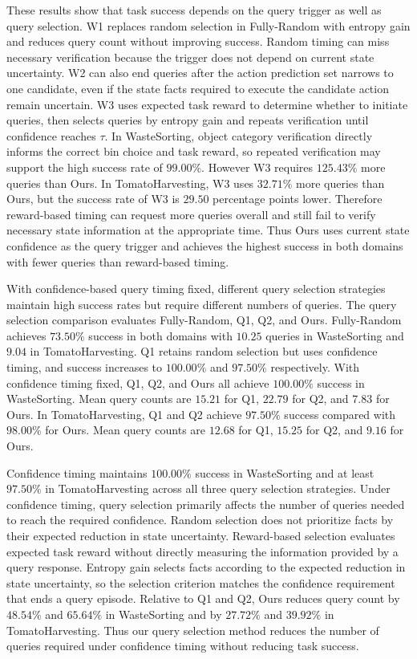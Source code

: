 These results show that task success depends on the query trigger as well as query selection. W1 replaces random selection in Fully-Random with entropy gain and reduces query count without improving success. Random timing can miss necessary verification because the trigger does not depend on current state uncertainty. W2 can also end queries after the action prediction set narrows to one candidate, even if the state facts required to execute the candidate action remain uncertain. W3 uses expected task reward to determine whether to initiate queries, then selects queries by entropy gain and repeats verification until confidence reaches $\tau$. In WasteSorting, object category verification directly informs the correct bin choice and task reward, so repeated verification may support the high success rate of $99.00\%$. However W3 requires $125.43\%$ more queries than Ours. In TomatoHarvesting, W3 uses $32.71\%$ more queries than Ours, but the success rate of W3 is $29.50$ percentage points lower. Therefore reward-based timing can request more queries overall and still fail to verify necessary state information at the appropriate time. Thus Ours uses current state confidence as the query trigger and achieves the highest success in both domains with fewer queries than reward-based timing.

With confidence-based query timing fixed, different query selection strategies maintain high success rates but require different numbers of queries. The query selection comparison evaluates Fully-Random, Q1, Q2, and Ours. Fully-Random achieves $73.50\%$ success in both domains with $10.25$ queries in WasteSorting and $9.04$ in TomatoHarvesting. Q1 retains random selection but uses confidence timing, and success increases to $100.00\%$ and $97.50\%$ respectively. With confidence timing fixed, Q1, Q2, and Ours all achieve $100.00\%$ success in WasteSorting. Mean query counts are $15.21$ for Q1, $22.79$ for Q2, and $7.83$ for Ours. In TomatoHarvesting, Q1 and Q2 achieve $97.50\%$ success compared with $98.00\%$ for Ours. Mean query counts are $12.68$ for Q1, $15.25$ for Q2, and $9.16$ for Ours.

Confidence timing maintains $100.00\%$ success in WasteSorting and at least $97.50\%$ in TomatoHarvesting across all three query selection strategies. Under confidence timing, query selection primarily affects the number of queries needed to reach the required confidence. Random selection does not prioritize facts by their expected reduction in state uncertainty. Reward-based selection evaluates expected task reward without directly measuring the information provided by a query response. Entropy gain selects facts according to the expected reduction in state uncertainty, so the selection criterion matches the confidence requirement that ends a query episode. Relative to Q1 and Q2, Ours reduces query count by $48.54\%$ and $65.64\%$ in WasteSorting and by $27.72\%$ and $39.92\%$ in TomatoHarvesting. Thus our query selection method reduces the number of queries required under confidence timing without reducing task success.

